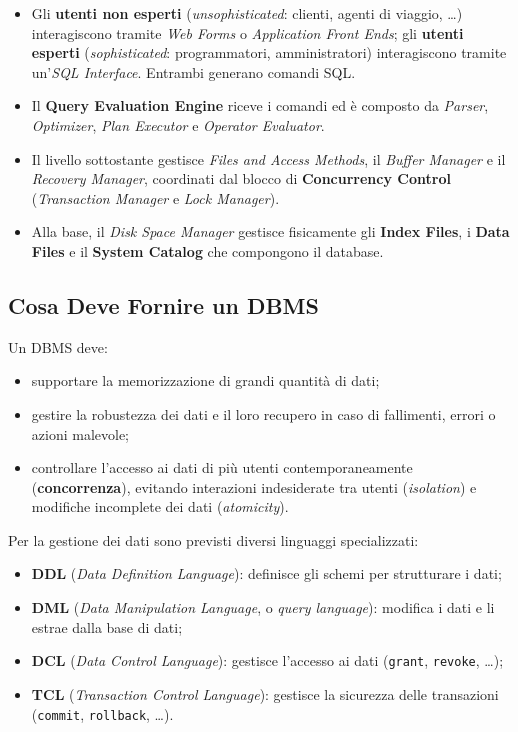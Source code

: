 \documentclass[12pt, a4paper]{article}
\begin{document}
\begin{itemize}
    \item Gli \textbf{utenti non esperti} (\textit{unsophisticated}: clienti, agenti di viaggio, \ldots) interagiscono tramite \textit{Web Forms} o \textit{Application Front Ends}; gli \textbf{utenti esperti} (\textit{sophisticated}: programmatori, amministratori) interagiscono tramite un'\textit{SQL Interface}. Entrambi generano comandi SQL.
    \item Il \textbf{Query Evaluation Engine} riceve i comandi ed è composto da \textit{Parser}, \textit{Optimizer}, \textit{Plan Executor} e \textit{Operator Evaluator}.
    \item Il livello sottostante gestisce \textit{Files and Access Methods}, il \textit{Buffer Manager} e il \textit{Recovery Manager}, coordinati dal blocco di \textbf{Concurrency Control} (\textit{Transaction Manager} e \textit{Lock Manager}).
    \item Alla base, il \textit{Disk Space Manager} gestisce fisicamente gli \textbf{Index Files}, i \textbf{Data Files} e il \textbf{System Catalog} che compongono il database.
\end{itemize}

\subsection{Cosa Deve Fornire un DBMS}

Un DBMS deve:
\begin{itemize}
    \item supportare la memorizzazione di grandi quantità di dati;
    \item gestire la robustezza dei dati e il loro recupero in caso di fallimenti, errori o azioni malevole;
    \item controllare l'accesso ai dati di più utenti contemporaneamente (\textbf{concorrenza}), evitando interazioni indesiderate tra utenti (\textit{isolation}) e modifiche incomplete dei dati (\textit{atomicity}).
\end{itemize}

Per la gestione dei dati sono previsti diversi linguaggi specializzati:
\begin{itemize}
    \item \textbf{DDL} (\textit{Data Definition Language}): definisce gli schemi per strutturare i dati;
    \item \textbf{DML} (\textit{Data Manipulation Language}, o \textit{query language}): modifica i dati e li estrae dalla base di dati;
    \item \textbf{DCL} (\textit{Data Control Language}): gestisce l'accesso ai dati (\texttt{grant}, \texttt{revoke}, \ldots);
    \item \textbf{TCL} (\textit{Transaction Control Language}): gestisce la sicurezza delle transazioni (\texttt{commit}, \texttt{rollback}, \ldots).
\end{itemize}
\end{document}
